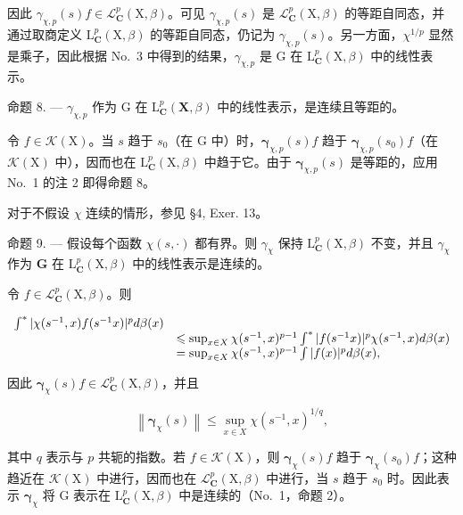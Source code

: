 因此 \(\gamma_{\chi,p}(s)f\in\mathcal{L}_{\mathbf{C}}^{p}(\mathrm{X},\beta)\)。可见 \(\gamma_{\chi,p}(s)\) 是 \(\mathcal{L}_{\mathbf{C}}^{p}(\mathrm{X},\beta)\) 的等距自同态，并通过取商定义 \(\mathrm{L}_{\mathbf{C}}^{p}(\mathrm{X},\beta)\) 的等距自同态，仍记为 \(\gamma_{\chi,p}(s)\)。另一方面，\(\chi^{1/p}\) 显然是乘子，因此根据 No.~3 中得到的结果，\(\gamma_{\chi,p}\) 是 G 在 \(\mathrm{L}_{\mathbf{C}}^{p}(\mathrm{X},\beta)\) 中的线性表示。

命题 8. --- \(\gamma_{\chi,p}\) 作为 G 在 \(\mathrm{L}_{\mathbf{C}}^{p}(\mathbf{X},\beta)\) 中的线性表示，是连续且等距的。

令 \(f \in \mathcal{K}(\mathrm{X})\)。当 \(s\) 趋于 \(s_0\)（在 \(\mathrm{G}\) 中）时，\(\boldsymbol{\gamma}_{\chi,p}(s)f\) 趋于 \(\boldsymbol{\gamma}_{\chi,p}(s_0)f\)（在 \(\mathcal{K}(\mathrm{X})\) 中），因而也在 \(\mathrm{L}_{\mathbf{C}}^p (\mathrm{X},\beta)\) 中趋于它。由于 \(\boldsymbol{\gamma}_{\chi,p}(s)\) 是等距的，应用 No.~1 的注 2 即得命题 8。

对于不假设 \(\chi\) 连续的情形，参见 §4, Exer. 13。

命题 9. --- 假设每个函数 \(\chi(s,\cdot)\) 都有界。则 \(\gamma_{\chi}\) 保持 \(\mathrm{L}_{\mathbf{C}}^{p}(\mathrm{X},\beta)\) 不变，并且 \(\gamma_{\chi}\) 作为 \(\mathbf{G}\) 在 \(\mathrm{L}_{\mathbf{C}}^{p}(\mathrm{X},\beta)\) 中的线性表示是连续的。

令 \(f\in \mathcal{L}_{\mathbf{C}}^{p}(\mathrm{X},\beta)\)。则

\[
\begin{array}{r l} \int^ {*} | \chi (s ^ {- 1}, x) f (s ^ {- 1} x) | ^ {p} d \beta (x) \\ & \leqslant \sup _ {x \in X} \chi (s ^ {- 1}, x) ^ {p - 1} \int^ {*} | f (s ^ {- 1} x) | ^ {p} \chi (s ^ {- 1}, x) d \beta (x) \\ & = \sup _ {x \in X} \chi (s ^ {- 1}, x) ^ {p - 1} \int | f (x) | ^ {p} d \beta (x), \end{array}
\]

因此 \(\pmb{\gamma}_{\chi}(s)f\in \mathcal{L}_{\mathbf{C}}^{p}(\mathrm{X},\beta)\)，并且

\[
\left\| \boldsymbol {\gamma} _ {\chi} (s) \right\| \leqslant \sup _ {x \in X} \chi (s ^ {- 1}, x) ^ {1 / q},\tag{5}
\]

其中 \(q\) 表示与 \(p\) 共轭的指数。若 \(f \in \mathcal{K}(\mathrm{X})\)，则 \(\boldsymbol{\gamma}_{\chi}(s)f\) 趋于 \(\boldsymbol{\gamma}_{\chi}(s_0)f\)；这种趋近在 \(\mathcal{K}(\mathrm{X})\) 中进行，因而也在 \(\mathcal{L}_{\mathbf{C}}^{p}(\mathrm{X},\beta)\) 中进行，当 \(s\) 趋于 \(s_0\) 时。因此表示 \(\boldsymbol{\gamma}_{\chi}\) 将 \(\mathrm{G}\) 表示在 \(\mathrm{L}_{\mathbf{C}}^{p}(\mathrm{X},\beta)\) 中是连续的（No.~1，命题 2）。

